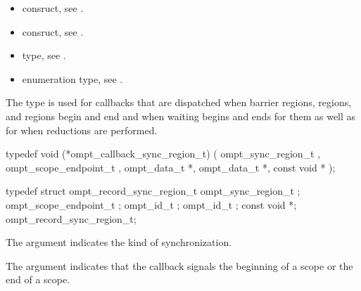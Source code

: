 \crossreferences
\begin{itemize}
\item {} consruct, see .

\item {} consruct, see .

\item {} type, see .

\item {} enumeration type, see
.
\end{itemize}



\label{sec:ompt_callback_sync_region_t}

\summary
The  type is used for callbacks that are 
dispatched when barrier regions,  regions, and 
regions begin and end and when waiting begins and ends for them as well as 
for when reductions are performed.

\format
\begin{ccppspecific}
\begin{omptCallback}
typedef void (*ompt_callback_sync_region_t) (
  ompt_sync_region_t ,
  ompt_scope_endpoint_t ,
  ompt_data_t *,
  ompt_data_t *,
  const void *
);
\end{omptCallback}
\end{ccppspecific}

\record
\begin{ccppspecific}
\begin{omptRecord}
typedef struct ompt_record_sync_region_t {
  ompt_sync_region_t ;
  ompt_scope_endpoint_t ;
  ompt_id_t ;
  ompt_id_t ;
  const void *;
} ompt_record_sync_region_t;
\end{omptRecord}
\end{ccppspecific}

\argdesc
The  argument indicates the kind of synchronization.

The  argument indicates that the callback signals
the beginning of a scope or the end of a scope.

